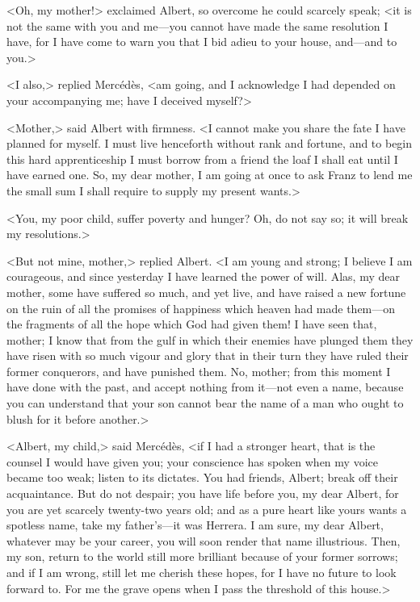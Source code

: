  <Oh, my mother!> exclaimed Albert, so overcome he could scarcely speak; <it is not the same with you and me—you cannot have made the same resolution I have, for I have come to warn you that I bid adieu to your house, and—and to you.> 

 <I also,> replied Mercédès, <am going, and I acknowledge I had depended on your accompanying me; have I deceived myself?> 

 <Mother,> said Albert with firmness. <I cannot make you share the fate I have planned for myself. I must live henceforth without rank and fortune, and to begin this hard apprenticeship I must borrow from a friend the loaf I shall eat until I have earned one. So, my dear mother, I am going at once to ask Franz to lend me the small sum I shall require to supply my present wants.> 

 <You, my poor child, suffer poverty and hunger? Oh, do not say so; it will break my resolutions.> 

 <But not mine, mother,> replied Albert. <I am young and strong; I believe I am courageous, and since yesterday I have learned the power of will. Alas, my dear mother, some have suffered so much, and yet live, and have raised a new fortune on the ruin of all the promises of happiness which heaven had made them—on the fragments of all the hope which God had given them! I have seen that, mother; I know that from the gulf in which their enemies have plunged them they have risen with so much vigour and glory that in their turn they have ruled their former conquerors, and have punished them. No, mother; from this moment I have done with the past, and accept nothing from it—not even a name, because you can understand that your son cannot bear the name of a man who ought to blush for it before another.> 

 <Albert, my child,> said Mercédès, <if I had a stronger heart, that is the counsel I would have given you; your conscience has spoken when my voice became too weak; listen to its dictates. You had friends, Albert; break off their acquaintance. But do not despair; you have life before you, my dear Albert, for you are yet scarcely twenty-two years old; and as a pure heart like yours wants a spotless name, take my father's—it was Herrera. I am sure, my dear Albert, whatever may be your career, you will soon render that name illustrious. Then, my son, return to the world still more brilliant because of your former sorrows; and if I am wrong, still let me cherish these hopes, for I have no future to look forward to. For me the grave opens when I pass the threshold of this house.> 

